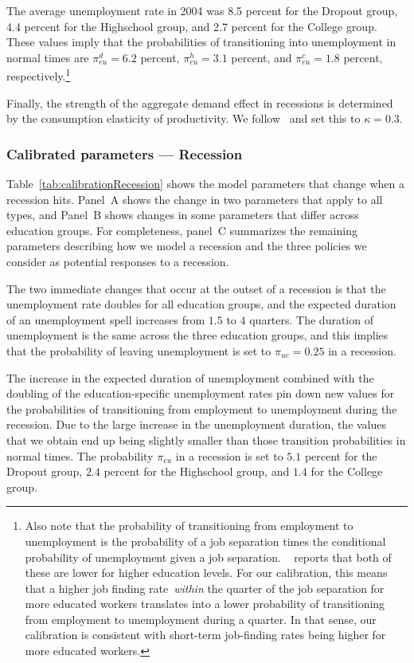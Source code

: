 \documentclass[\latexroot/\projectname]{subfiles}
\begin{document}
The average unemployment rate in 2004 was 8.5 percent for the Dropout group, 4.4 percent for the Highschool group, and 2.7 percent for the College group.
These values imply that the probabilities of transitioning into unemployment in normal times are $\pi_{eu}^d=6.2$ percent, $\pi_{eu}^h=3.1$ percent, and $\pi_{eu}^c=1.8$ percent, respectively.\footnote{Also note that the probability of transitioning from employment to unemployment is the probability of a job separation times the conditional probability of unemployment given a job separation.
  ~\cite{mincer1991education} reports that both of these are lower for higher education levels.
  For our calibration, this means that a higher job finding rate~\textit{within} the quarter of the job separation for more educated workers translates	into a lower probability of transitioning from employment to unemployment during a quarter.
  In that sense, our calibration is consistent with short-term job-finding rates being higher for more educated workers.}

Finally, the strength of the aggregate demand effect in recessions is determined by the consumption elasticity of productivity.
We follow~\cite{kmpHandbook} and set this to $\kappa=0.3$.

\subsubsection{Calibrated parameters --- Recession}
\whenintegrated{\label{sec:calibRecession}}

Table~\ref{tab:calibrationRecession} shows the model parameters that change when a recession hits. Panel~A shows the change in two parameters that apply to all types, and Panel~B shows changes in some parameters that differ across education groups. For completeness, panel~C summarizes the remaining parameters describing how we model a recession and the three policies we consider as potential responses to a recession.

The two immediate changes that occur at the outset of a recession is that the unemployment rate doubles for all education groups, and the expected duration of an unemployment spell increases from $1.5$ to $4$ quarters. The duration of unemployment is the same across the three education groups, and this implies that the probability of leaving unemployment is set to $\pi_{ue} = 0.25$ in a recession.

The increase in the expected duration of unemployment combined with the doubling of the education-specific unemployment rates pin down new values for the probabilities of transitioning from employment to unemployment during the recession. Due to the large increase in the unemployment duration, the values that we obtain end up being slightly smaller than those transition probabilities in normal times. The probability $\pi_{eu}$ in a recession is set to $5.1$ percent for the Dropout group, $2.4$ percent for the Highschool group, and $1.4$ for the College group.
\end{document}
